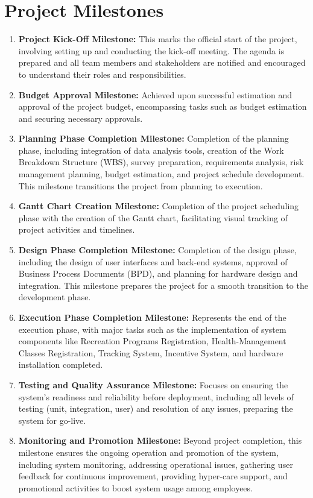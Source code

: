 \section{Project Milestones}
\begin{enumerate}
    \item \textbf{Project Kick-Off Milestone:}
    This marks the official start of the project, involving setting up and conducting the kick-off meeting. The agenda is prepared and all team members and stakeholders are notified and encouraged to understand their roles and responsibilities.

    \item \textbf{Budget Approval Milestone:}
    Achieved upon successful estimation and approval of the project budget, encompassing tasks such as budget estimation and securing necessary approvals.
    

    \item \textbf{Planning Phase Completion Milestone:}
    Completion of the planning phase, including integration of data analysis tools, creation of the Work Breakdown Structure (WBS), survey preparation, requirements analysis, risk management planning, budget estimation, and project schedule development. This milestone transitions the project from planning to execution.
    
    \item \textbf{Gantt Chart Creation Milestone:}
    Completion of the project scheduling phase with the creation of the Gantt chart, facilitating visual tracking of project activities and timelines.
    
    \item \textbf{Design Phase Completion Milestone:}
    Completion of the design phase, including the design of user interfaces and back-end systems, approval of Business Process Documents (BPD), and planning for hardware design and integration. This milestone prepares the project for a smooth transition to the development phase.
    
    \item \textbf{Execution Phase Completion Milestone:}
    Represents the end of the execution phase, with major tasks such as the implementation of system components like Recreation Programs Registration, Health-Management Classes Registration, Tracking System, Incentive System, and hardware installation completed.
    
    \item \textbf{Testing and Quality Assurance Milestone:}
    Focuses on ensuring the system's readiness and reliability before deployment, including all levels of testing (unit, integration, user) and resolution of any issues, preparing the system for go-live.
    
    \item \textbf{Monitoring and Promotion Milestone:}
    Beyond project completion, this milestone ensures the ongoing operation and promotion of the system, including system monitoring, addressing operational issues, gathering user feedback for continuous improvement, providing hyper-care support, and promotional activities to boost system usage among employees.
\end{enumerate}

